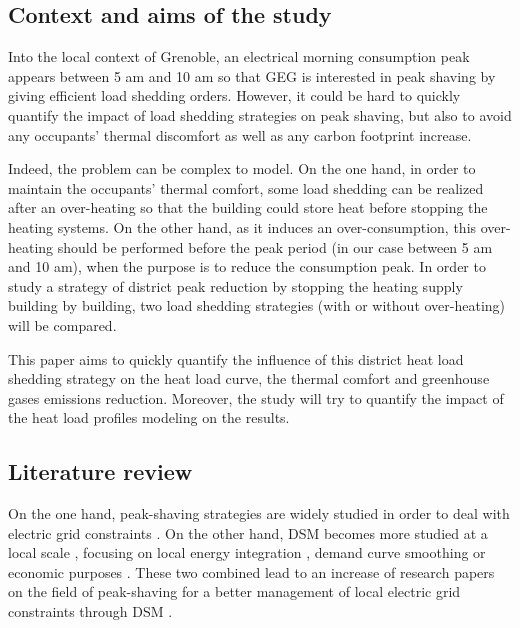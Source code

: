 \documentclass[buildings,article,submit,moreauthors,pdftex,10pt,a4paper]{mdpi}
\theoremstyle{mdpi}
\newcounter{ex}
\newcounter{re}
\theoremstyle{mdpidefinition}
\begin{document}
\subsection{Context and aims of the study}
Into the local context of Grenoble, an electrical morning consumption peak appears between 5 am and 10 am so that GEG is interested in peak shaving by giving efficient load shedding orders.  However, it could be hard to quickly quantify the impact of load shedding strategies on peak shaving, but also to avoid any occupants' thermal discomfort as well as any carbon footprint increase.

Indeed, the problem can be complex to model. On the one hand, in order to maintain the occupants' thermal comfort, some load shedding can be realized after an over-heating so that the building could store heat before stopping the heating systems. On the other hand, as it induces an over-consumption, this over-heating should be performed before the peak period (in our case between 5 am and 10 am), when the purpose is to reduce the consumption peak. In order to study a strategy of district peak reduction by stopping the heating supply building by building, two load shedding strategies (with or without over-heating) will be compared. 

This paper aims to quickly quantify the influence of this district heat load shedding strategy on the heat load curve, the thermal comfort and greenhouse gases emissions reduction. Moreover, the study will try to quantify the impact of the heat load profiles modeling on the results.


\subsection{Literature review}	%
On the one hand, peak-shaving strategies are widely studied in order to deal with electric grid constraints \cite{UDDIN20183323}. On the other hand, DSM becomes more studied at a local scale \cite{MULLER2015283}, focusing on local energy integration \cite{salpakari_improved_2016}, demand curve smoothing \cite{zhang_linearized_2018} or economic purposes \cite{behrangrad_review_2015}. These two combined lead to an increase of research papers on the field of peak-shaving for a better management of local electric grid constraints through DSM \cite{Baeten_2017}.
\end{document}
